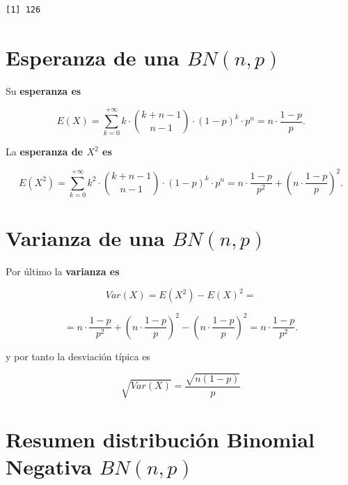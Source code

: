 \documentclass[
  letterpaper,
  DIV=11,
  numbers=noendperiod]{scrreprt}
\begin{document}
\begin{verbatim}
[1] 126
\end{verbatim}

\section{\texorpdfstring{Esperanza de una
\(BN(n,p)\)}{Esperanza de una BN(n,p)}}\label{esperanza-de-una-bnnp}

Su \textbf{esperanza es}

\[E(X)=\sum_{k=0}^{+\infty} k\cdot {k+n-1\choose n-1} \cdot (1-p)^{k}\cdot p^n=n\cdot\frac{1-p}{p}.\]

La \textbf{esperanza de \(X^2\) es}

\[E(X^2)=\sum_{k=0}^{+\infty} k^2\cdot {k+n-1\choose n-1} \cdot (1-p)^{k}\cdot p^n=n\cdot\frac{1-p}{p^2}+\left(n\cdot \frac{1-p}{p}\right)^2.\]

\section{\texorpdfstring{Varianza de una
\(BN(n,p)\)}{Varianza de una BN(n,p)}}\label{varianza-de-una-bnnp}

Por último la \textbf{varianza es}

\[
Var(X)=E(X^2)-E(X)^2=
\]

\[=n\cdot \frac{1-p}{p^2}+\left(n\cdot \frac{1-p}{p}\right)^2-\left(n\cdot \frac{1-p}{p}\right)^2=
n\cdot \frac{1-p}{p^2}.\]

y por tanto la desviación típica es

\[\sqrt{Var(X)} = \frac{\sqrt{n(1-p)}}{p}\]

\section{\texorpdfstring{Resumen distribución Binomial Negativa
\(BN(n,p)\)}{Resumen distribución Binomial Negativa BN(n,p)}}\label{resumen-distribuciuxf3n-binomial-negativa-bnnp}
\end{document}
